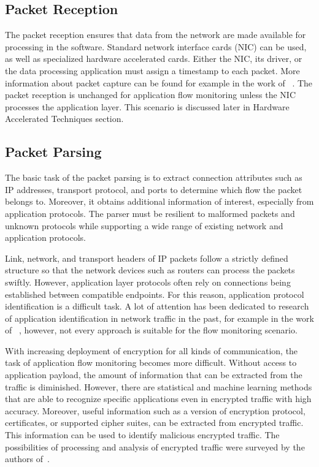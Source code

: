 \subsection{Packet Reception}

The packet reception ensures that data from the network are made available for processing in the software. Standard network interface cards (NIC) can be used, as well as specialized hardware accelerated cards. Either the NIC, its driver, or the data processing application must assign a timestamp to each packet. More information about packet capture can be found for example in the work of \citeauthor{Garcia-Dorado-2013-High}~\cite{Garcia-Dorado-2013-High}. The packet reception is unchanged for application flow monitoring unless the NIC processes the application layer. This scenario is discussed later in Hardware Accelerated Techniques section.


\subsection{Packet Parsing}

The basic task of the packet parsing is to extract connection attributes such as IP addresses, transport protocol, and ports to determine which flow the packet belongs to. Moreover, it obtains additional information of interest, especially from application protocols. The parser must be resilient to malformed packets and unknown protocols while supporting a wide range of existing network and application protocols.

Link, network, and transport headers of IP packets follow a strictly defined structure so that the network devices such as routers can process the packets swiftly. However, application layer protocols often rely on connections being established between compatible endpoints. For this reason, application protocol identification is a difficult task. A lot of attention has been dedicated to research of application identification in network traffic in the past, for example in the work of \citeauthor{Bujlow-2015-classification}~\cite{Bujlow-2015-classification}, however, not every approach is suitable for the flow monitoring scenario.

With increasing deployment of encryption for all kinds of communication, the task of application flow monitoring becomes more difficult. Without access to application payload, the amount of information that can be extracted from the traffic is diminished. However, there are statistical and machine learning methods that are able to recognize specific applications even in encrypted traffic with high accuracy. Moreover, useful information such as a version of encryption protocol, certificates, or supported cipher suites, can be extracted from encrypted traffic. This information can be used to identify malicious encrypted traffic. The possibilities of processing and analysis of encrypted traffic were surveyed by the authors of~\cite{Velan-2015-Survey}.

